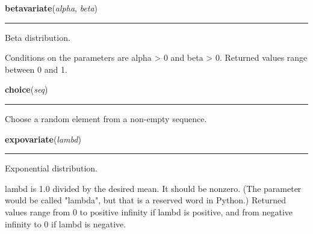     \label{random:betavariate}

    \vspace{0.5ex}

\hspace{.8\funcindent}\begin{boxedminipage}{\funcwidth}

    \raggedright \textbf{betavariate}(\textit{alpha}, \textit{beta})

    \vspace{-1.5ex}

    \rule{\textwidth}{0.5\fboxrule}
\setlength{\parskip}{2ex}
    Beta distribution.

    Conditions on the parameters are alpha {\textgreater} 0 and beta 
    {\textgreater} 0. Returned values range between 0 and 1.

\setlength{\parskip}{1ex}
    \end{boxedminipage}

    \label{random:choice}

    \vspace{0.5ex}

\hspace{.8\funcindent}\begin{boxedminipage}{\funcwidth}

    \raggedright \textbf{choice}(\textit{seq})

    \vspace{-1.5ex}

    \rule{\textwidth}{0.5\fboxrule}
\setlength{\parskip}{2ex}
    Choose a random element from a non-empty sequence.

\setlength{\parskip}{1ex}
    \end{boxedminipage}

    \label{random:expovariate}

    \vspace{0.5ex}

\hspace{.8\funcindent}\begin{boxedminipage}{\funcwidth}

    \raggedright \textbf{expovariate}(\textit{lambd})

    \vspace{-1.5ex}

    \rule{\textwidth}{0.5\fboxrule}
\setlength{\parskip}{2ex}
    Exponential distribution.

    lambd is 1.0 divided by the desired mean.  It should be nonzero.  (The 
    parameter would be called "lambda", but that is a reserved word in 
    Python.)  Returned values range from 0 to positive infinity if lambd is
    positive, and from negative infinity to 0 if lambd is negative.

\setlength{\parskip}{1ex}
    \end{boxedminipage}

